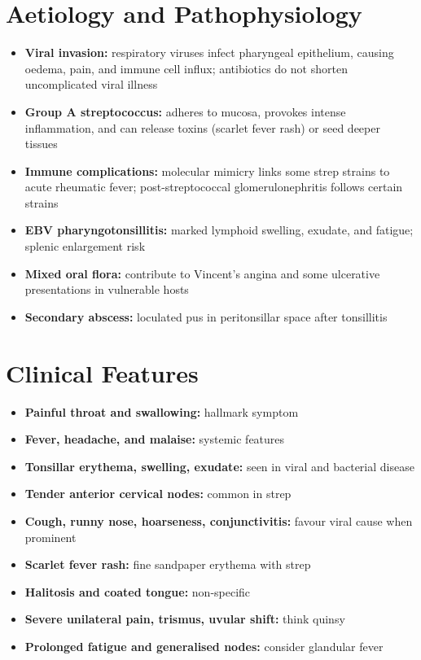 \section*{Aetiology and Pathophysiology}
\begin{itemize}
    \item \textbf{Viral invasion:} respiratory viruses infect pharyngeal epithelium, causing oedema, pain, and immune cell influx; antibiotics do not shorten uncomplicated viral illness
    \item \textbf{Group A streptococcus:} adheres to mucosa, provokes intense inflammation, and can release toxins (scarlet fever rash) or seed deeper tissues
    \item \textbf{Immune complications:} molecular mimicry links some strep strains to acute rheumatic fever; post-streptococcal glomerulonephritis follows certain strains
    \item \textbf{EBV pharyngotonsillitis:} marked lymphoid swelling, exudate, and fatigue; splenic enlargement risk
    \item \textbf{Mixed oral flora:} contribute to Vincent's angina and some ulcerative presentations in vulnerable hosts
    \item \textbf{Secondary abscess:} loculated pus in peritonsillar space after tonsillitis
\end{itemize}

\section*{Clinical Features}
\begin{itemize}
    \item \textbf{Painful throat and swallowing:} hallmark symptom
    \item \textbf{Fever, headache, and malaise:} systemic features
    \item \textbf{Tonsillar erythema, swelling, exudate:} seen in viral and bacterial disease
    \item \textbf{Tender anterior cervical nodes:} common in strep
    \item \textbf{Cough, runny nose, hoarseness, conjunctivitis:} favour viral cause when prominent
    \item \textbf{Scarlet fever rash:} fine sandpaper erythema with strep
    \item \textbf{Halitosis and coated tongue:} non-specific
    \item \textbf{Severe unilateral pain, trismus, uvular shift:} think quinsy
    \item \textbf{Prolonged fatigue and generalised nodes:} consider glandular fever
\end{itemize}

